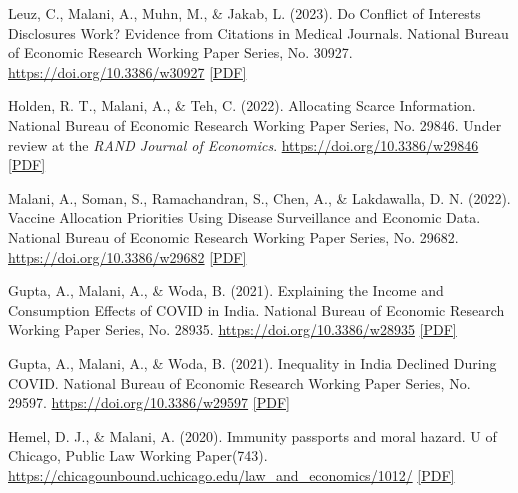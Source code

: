 \begin{tablist}
        \item[2023] \tab{}Leuz, C., Malani, A., Muhn, M., & Jakab, L. (2023). Do Conflict of Interests Disclosures Work? Evidence from Citations in Medical Journals. National Bureau of Economic Research Working Paper Series, No. 30927. \href{https://doi.org/10.3386/w30927}{https://doi.org/10.3386/w30927} \href{https://github.com/anup-malani/website_personal/blob/main/publications/2023_LeuzMalani_NBERw30927_COIDisclosuresMedicine.pdf}{[PDF]}

        \item[2022] \tab{}Holden, R. T., Malani, A., \& Teh, C. (2022). Allocating Scarce Information. National Bureau of Economic Research Working Paper Series, No. 29846. Under review at the \textit{RAND Journal of Economics}. \href{https://doi.org/10.3386/w29846}{https://doi.org/10.3386/w29846} \href{https://github.com/anup-malani/website_personal/blob/main/publications/2022_HoldenMalani_NBERw29846_AllocatinScarceInfo.pdf}{[PDF]} 

        \item[2022] \tab{}Malani, A., Soman, S., Ramachandran, S., Chen, A., \& Lakdawalla, D. N. (2022). Vaccine Allocation Priorities Using Disease Surveillance and Economic Data. National Bureau of Economic Research Working Paper Series, No. 29682. \href{https://doi.org/10.3386/w29682}{https://doi.org/10.3386/w29682} \href{https://github.com/anup-malani/website_personal/blob/main/publications/2022_Malani_NBERw29682_VaccineAllocationPrioritiesDemand.pdf}{[PDF]} 

        \item[2021] \tab{}Gupta, A., Malani, A., \& Woda, B. (2021). Explaining the Income and Consumption Effects of COVID in India. National Bureau of Economic Research Working Paper Series, No. 28935. \href{https://doi.org/10.3386/w28935}{https://doi.org/10.3386/w28935} \href{https://github.com/anup-malani/website_personal/blob/main/publications/2021_GuptaMalani_NBERw29597_ExplaininIncomeConsumptionCovidIndia.pdf}{[PDF]} 

        \item[2021] \tab{}Gupta, A., Malani, A., \& Woda, B. (2021). Inequality in India Declined During COVID. National Bureau of Economic Research Working Paper Series, No. 29597. \href{https://doi.org/10.3386/w29597}{https://doi.org/10.3386/w29597} \href{https://github.com/anup-malani/website_personal/blob/main/publications/2021_GuptaMalani_NBERw29597_InequalityIndiaCOVID.pdf}{[PDF]} 

        \item[2020] \tab{}Hemel, D. J., \& Malani, A. (2020). Immunity passports and moral hazard. U of Chicago, Public Law Working Paper(743). \href{https://chicagounbound.uchicago.edu/law_and_economics/1012/}{https://chicagounbound.uchicago.edu/law\_and\_economics/1012/} \href{https://github.com/anup-malani/website_personal/blob/main/publications/2020_HemelMalani_ImmunityPassportsMoralHazardCOVID.pdf}{[PDF]}


\end{tablist}
